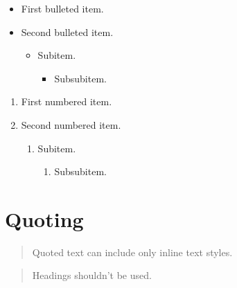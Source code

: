 \documentclass[10pt]{article}
\begin{document}
\begin{itemize}

\item First bulleted item.

\item Second bulleted item.

    \begin{itemize}

    \item Subitem.

        \begin{itemize}

        \item Subsubitem.

        \end{itemize}

    \end{itemize}

\end{itemize}

\begin{enumerate}

\item First numbered item.

\item Second numbered item.

    \begin{enumerate}

    \item Subitem.

        \begin{enumerate}

        \item Subsubitem.

        \end{enumerate}

    \end{enumerate}

\end{enumerate}

\section{Quoting}

\begin{quotation}
Quoted text can include only inline text styles.
\end{quotation}

\begin{quotation}
Headings shouldn’t be used.
\end{quotation}
\end{document}
